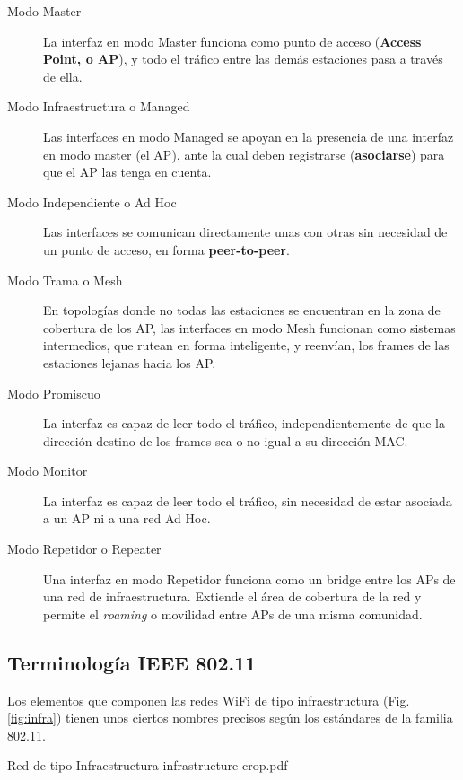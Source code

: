\begin{description}
    \item[Modo Master]
    La interfaz en modo Master funciona como punto de acceso (\textbf{Access Point, o AP}), y todo el tráfico entre las demás estaciones pasa a través de ella. 
    \item[Modo Infraestructura o Managed]
    Las interfaces en modo Managed se apoyan en la presencia de una interfaz en modo master (el AP), ante la cual deben registrarse (\textbf{asociarse}) para que el AP las tenga en cuenta.
    \item[Modo Independiente o Ad Hoc]
    Las interfaces se comunican directamente unas con otras sin necesidad de un punto de acceso, en forma \textbf{peer-to-peer}.
    \item[Modo Trama o Mesh]
    En topologías donde no todas las estaciones se encuentran en la zona de cobertura de los AP, las interfaces en modo Mesh funcionan como sistemas intermedios, que rutean en forma inteligente, y reenvían, los frames de las estaciones lejanas hacia los AP. 
    \item[Modo Promiscuo]
    La interfaz es capaz de leer todo el tráfico, independientemente de que la dirección destino de los frames sea o no igual a su dirección MAC. 
    \item[Modo Monitor]
    La interfaz es capaz de leer todo el tráfico, sin necesidad de estar asociada a un AP ni a una red Ad Hoc.
    \item[Modo Repetidor o Repeater]
    Una interfaz en modo Repetidor funciona como un bridge entre los APs de una red de infraestructura. Extiende el área de cobertura de la red y permite el \textit{roaming} o movilidad entre APs de una misma comunidad.
\end{description}



\subsection{Terminología IEEE 802.11}
Los elementos que componen las redes WiFi de tipo infraestructura (Fig. \ref{fig:infra}) tienen unos ciertos nombres precisos según los estándares de la familia 802.11.

 {Red de tipo Infraestructura} {infrastructure-crop.pdf}

